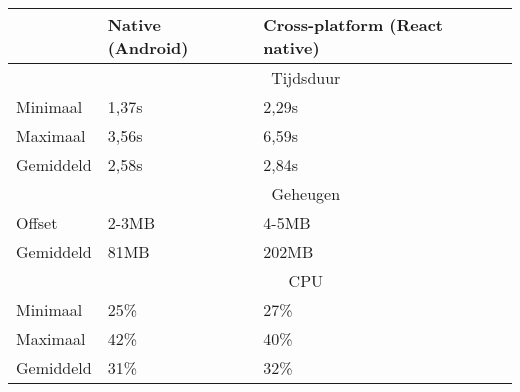 \begin{tabular}{ |p{3cm}||p{6cm}|p{6cm}| }
    \hline
     & Native (Android) & Cross-platform (React native) \\
    \hline
     & \multicolumn{2}{|c|}{Tijdsduur} \\
    \hline
    Minimaal & 1,37s & 2,29s \\
    Maximaal & 3,56s & 6,59s \\
    Gemiddeld & 2,58s & 2,84s \\
    \hline
     & \multicolumn{2}{|c|}{Geheugen} \\ 
    \hline
    Offset & 2-3MB & 4-5MB \\
    Gemiddeld & 81MB & 202MB \\
    \hline
     & \multicolumn{2}{|c|}{CPU} \\
    \hline
    Minimaal & 25\% & 27\% \\
    Maximaal & 42\% & 40\% \\
    Gemiddeld & 31\% & 32\% \\
    \hline
\end{tabular}
\\\\





















